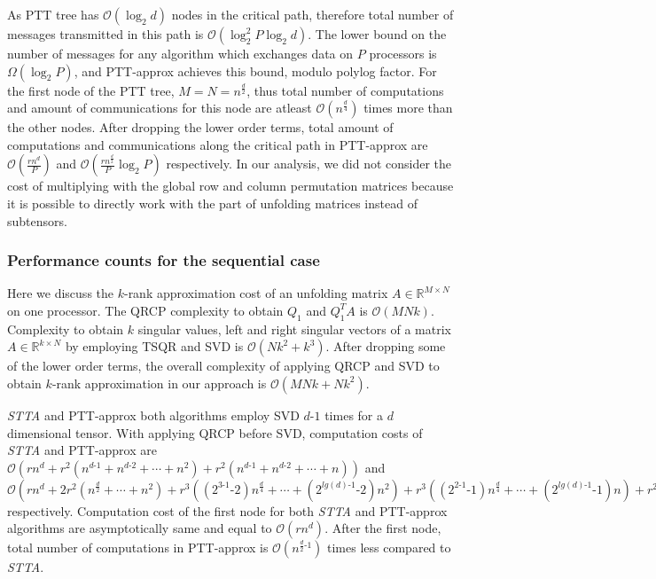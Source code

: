 \documentclass[sigconf]{acmart}
\newcommand{\otta}{{\it STTA}\xspace}
\begin{document}
As PTT tree has $\mathcal{O}(\log_2 d)$ nodes in the critical path, therefore total number of messages transmitted in this path is $\mathcal{O}(\log_2^2 P  \log_2 d)$. The lower bound on the number of  messages for any algorithm which exchanges data on $P$ processors is $\Omega(\log_2 P)$, and PTT-approx achieves this bound, modulo polylog factor. For the first node of the PTT tree, $M=N=n^\frac{d}{2}$, thus total number of computations and amount of communications for this node are atleast $\mathcal{O}(n^\frac{d}{4})$ times more than the other nodes. After dropping the lower order terms, total amount of computations and communications along the critical path in PTT-approx are $\mathcal{O}(\frac{rn^d}{P})$ and $\mathcal{O}(\frac{rn^\frac{d}{2}}{P} \log_2 P)$ respectively. In our analysis, we did not consider the cost of multiplying with the global row and column permutation matrices because it is possible to directly work with the part of unfolding matrices instead of subtensors.


\subsubsection{Performance counts for the sequential case}
Here we discuss the $k$-rank approximation cost of an unfolding matrix $A\in \mathbb{R}^{M\times N}$ on one processor. The QRCP complexity to obtain $Q_1$ and $Q_1^TA$ is $\mathcal{O}(MNk)$. Complexity to obtain $k$ singular values, left and right singular vectors of a matrix $A\in\mathbb{R}^{k\times N}$ by employing TSQR and SVD is $\mathcal{O}(Nk^2 +k^3)$. After dropping some of the lower order terms, the overall complexity of applying QRCP and SVD to obtain $k$-rank approximation in our approach is $\mathcal{O}(MNk + Nk^2)$.



\otta and PTT-approx both algorithms employ SVD $d$-$1$ times for a $d$ dimensional tensor. With applying QRCP before SVD, computation costs of \otta and PTT-approx are $\mathcal{O}(rn^d + r^2 (n^{d\text{-}1} + n^{d\text{-}2} + \cdots + n^2) + r^2 (n^{d\text{-}1} + n^{d\text{-}2} + \cdots + n))$ and $\mathcal{O}(rn^d + 2r^2(n^\frac{d}{2}+\cdots+n^2) + r^3 ((2^{3\text{-}1}\text{-}2)n^\frac{d}{4} + \cdots+ (2^{lg(d)\text{-}1}\text{-}2)n^2) + r^3((2^{2\text{-}1}\text{-}1)n^\frac{d}{4}+\cdots+(2^{lg(d)\text{-}1}\text{-}1)n) + r^2 (n^\frac{d}{2} +\cdots+n))$ respectively. Computation cost of the first node for both \otta and PTT-approx algorithms are asymptotically same and equal to $\mathcal{O}(rn^d)$. After the first node, total number of computations in PTT-approx is $\mathcal{O}(n^{\frac{d}{2}\text{-}1})$ times less compared to \otta. 
\end{document}

